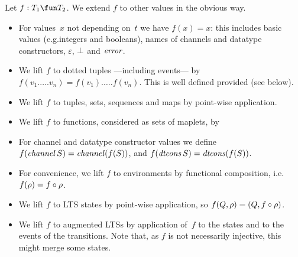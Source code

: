 Let $f : T_1 \fun T_2$.  We extend $f$ to other
values in the obvious way.
\begin{itemize}
\item For values~$x$ not depending on~$t$ we have $f(x) = x$: this includes
  basic values (e.g.integers and booleans), names of channels and datatype
  constructors, $\varepsilon$, $\perp$ and $\mathord{\it error}$.

\item We lift $f$ to dotted tuples ---including events--- by
  $f(v_1.\ldots.v_n) = f(v_1).\ldots.f(v_n)$.  This is well defined provided
   (see below).

\item We lift $f$ to tuples, sets, sequences and maps by point-wise
  application.

\item We lift $f$ to functions, considered as sets of maplets, by

\item For channel and datatype constructor values we define
  $f(\mathop{\it channel} S) = \mathop{\it channel} (f(S))$, and
  $f(\mathop{\it dtcons} S) = \mathop{\it dtcons} (f(S))$.

\item For convenience, we lift $f$ to environments by functional
  composition, i.e.~$f(\rho) = f\circ\rho$.

\item We lift $f$ to LTS states by point-wise application, so $f(Q,\rho) =
  (Q, f\circ\rho)$. 

\item We lift $f$ to augmented LTSs by application of~$f$ to the states
  and to the events of the transitions.  Note that, as $f$ is not necessarily
  injective, this might merge some states. 
\end{itemize}

